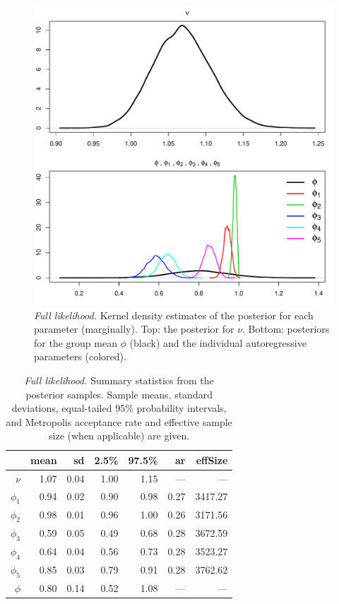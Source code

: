 \documentclass[12pt]{article}
\begin{document}
\begin{figure}[H]
\begin{center}
\includegraphics[scale=0.60]{figs/posts_2.pdf}
\end{center}
\caption{\emph{Full likelihood.} Kernel density estimates of the posterior for each parameter (marginally). Top: the posterior for $\nu$. Bottom: posteriors for the group mean $\phi$ (black) and the individual autoregressive parameters (colored).}
\label{posts_2}
\end{figure}

\begin{table}[H]
\begin{center}
\begin{tabular}{rrrrrrr}
  \hline
 & mean & sd & 2.5\% & 97.5\% & ar & effSize \\ 
  \hline
$\nu   $ & 1.07 & 0.04 & 1.00 & 1.15 & --- & --- \\ 
$\phi_1$ & 0.94 & 0.02 & 0.90 & 0.98 & 0.27 & 3417.27 \\ 
$\phi_2$ & 0.98 & 0.01 & 0.96 & 1.00 & 0.26 & 3171.56 \\ 
$\phi_3$ & 0.59 & 0.05 & 0.49 & 0.68 & 0.28 & 3672.59 \\ 
$\phi_4$ & 0.64 & 0.04 & 0.56 & 0.73 & 0.28 & 3523.27 \\ 
$\phi_5$ & 0.85 & 0.03 & 0.79 & 0.91 & 0.28 & 3762.62 \\ 
$\phi  $ & 0.80 & 0.14 & 0.52 & 1.08 & --- & --- \\ 
   \hline
\end{tabular}
\end{center}
\caption{\emph{Full likelihood.} Summary statistics from the posterior samples. Sample means, standard deviations, equal-tailed 95\% probability intervals, and Metropolis acceptance rate and effective sample size (when applicable) are given.}
\label{summ2}
\end{table}
\end{document}
